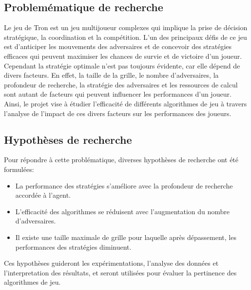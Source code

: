 \tocless\subsection{Problemématique de recherche}
Le jeu de Tron est un jeu multijoueur complexes qui implique la prise de décision stratégique,
la coordination et la compétition. L'un des principaux défis de ce jeu est d'anticiper les mouvements
des adversaires et de concevoir des stratégies efficaces qui peuvent maximiser les chances de survie et
de victoire d'un joueur. Cependant la stratégie optimale n'est pas toujours évidente, car elle dépend
de divers facteurs. En effet, la taille de la grille, le nombre d'adversaires, la profondeur de recherche, 
la stratégie des adversaires et les ressources de calcul sont autant de facteurs qui peuvent influencer
les performances d'un joueur. Ainsi, le projet vise à étudier l'efficacité de différents algorithmes de jeu
à travers l'analyse de l'impact de ces divers facteurs sur les performances des joueurs.\\

\tocless\subsection{Hypothèses de recherche}
Pour répondre à cette problématique, diverses hypothèses de recherche ont été formulées:
\begin{itemize}
	\item La performance des stratégies s'améliore avec la profondeur de recherche accordée à l'agent.
	\item L'efficacité des algorithmes se réduisent avec l'augmentation du nombre d'adversaires.
	\item Il existe une taille maximale de grille pour laquelle après dépassement, les performances des stratégies diminuent.
\end{itemize}
Ces hypothèses guideront les expérimentations, l'analyse des données et l'interpretation des résultats, et 
seront utilisées pour évaluer la pertinence des algorithmes de jeu.